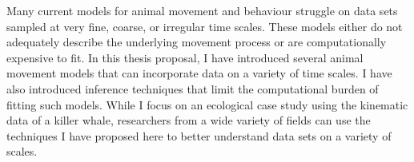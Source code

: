 Many current models for animal movement and behaviour struggle on data sets sampled at very fine, coarse, or irregular time scales. These models either do not adequately describe the underlying movement process or are computationally expensive to fit. In this thesis proposal, I have introduced several animal movement models that can incorporate data on a variety of time scales. I have also introduced inference techniques that limit the computational burden of fitting such models. While I focus on an ecological case study using the kinematic data of a killer whale, researchers from a wide variety of fields can use the techniques I have proposed here to better understand data sets on a variety of scales.

\fi